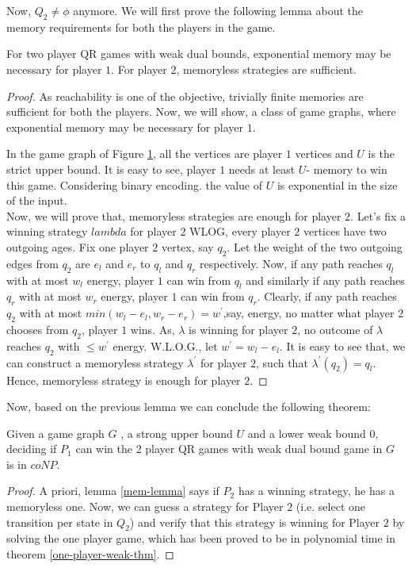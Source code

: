 Now, $Q_2 \not = \phi$ anymore. We will first prove the following lemma about the memory requirements for both the players in the game.\\
\begin{lemma}
\label{mem-lemma}
For two player QR games with weak dual bounds, exponential memory may be necessary for player $1$. For player $2$, memoryless strategies are sufficient.
\end{lemma}
\begin{proof}
As reachability is one of the objective, trivially finite memories are sufficient for both the players. Now, we will show, a class of game graphs, where exponential memory may be necessary for player $1$.\\
\begin{figure}[htb]
\hskip 6cm
\label{expmem-p1}

\end{figure}

In the game graph of Figure \ref{expmem-p1}, all the vertices are player $1$  vertices and $U$ is the strict upper bound. It is easy to see, player $1$ needs at least $U$- memory to win this game. Considering binary encoding. the value of $U$ is exponential in the size of the input.\\
Now, we will prove that, memoryless strategies are enough for player $2$. Let's fix a winning strategy $lambda$ for player $2$  WLOG, every player $2$ vertices have two outgoing ages. Fix one player $2$ vertex, say $q_2$. Let the weight of the two outgoing edges from $q_2$ are $e_l$ and $e_r$ to $q_l$ and $q_r$ respectively. Now, if any path reaches $q_l$ with at most $w_l$ energy, player $1$ can win from $q_l$ and similarly if any path reaches $q_r$ with at most $w_r$ energy, player $1$ can win from $q_r$. Clearly, if any path reaches $q_2$ with at most $min(w_l-e_l, w_r-e_r)= w^{\prime}$,say, energy, no matter what player $2$ chooses from $q_2$, player $1$ wins. As, $\lambda$ is winning for player $2$, no outcome of $\lambda$ reaches $q_2$ with $\leq w^{\prime}$ energy. W.L.O.G., let $w^{\prime}= w_l -e_l$. It is easy to see that, we can construct a memoryless strategy $\lambda^{\prime}$ for player $2$, such that $\lambda^{\prime}(q_2)=q_l$. Hence, memoryless strategy is enough for player $2$.
\end{proof}
\vskip 0.2cm

Now, based on the previous lemma we can conclude the following theorem:\\
\begin{theorem}
\label{two-player-weak-thm}
Given a game graph $G$ , a strong upper bound $U$ and a lower weak bound $0$, deciding if $P_1$ can win the 2 player QR games with weak dual bound game in $G$ is in $coNP$.
\end{theorem}
\begin{proof}
A priori, lemma \ref{mem-lemma} says if $P_2$ has a winning strategy, he has a memoryless one. Now, we can guess a strategy for Player $2$ (i.e. select one transition per state in $Q_2$) and verify that this strategy is winning for Player $2$ by solving the one player game, which has been proved to be in polynomial time in theorem \ref{one-player-weak-thm}.
\end{proof}
\vskip 0.5cm
